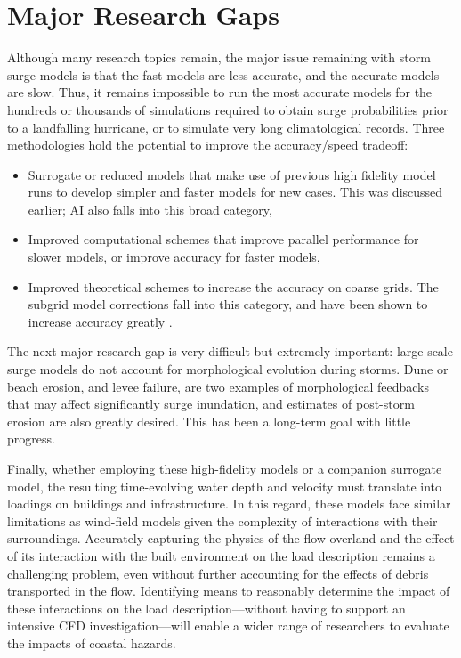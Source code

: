 \section{Major Research Gaps}
\label{sec:storm_surge_gaps}

Although many research topics remain, the major issue remaining with storm surge models is that the fast models are less accurate, and the accurate models are slow. Thus, it remains impossible to run the most accurate models for the hundreds or thousands of simulations required to obtain surge probabilities prior to a landfalling hurricane, or to simulate very long climatological records. Three methodologies hold the potential to improve the accuracy/speed tradeoff:

\begin{itemize}
    \item Surrogate or reduced models that make use of previous high fidelity model runs to develop simpler and faster models for new cases. This was discussed earlier; AI also falls into this broad category,
    \item Improved computational schemes that improve parallel performance for slower models, or improve accuracy for faster models,
    \item Improved theoretical schemes to increase the accuracy on coarse grids. The subgrid model corrections fall into this category, and have been shown to increase accuracy greatly \citep{kennedy2019a}.
\end{itemize}

The next major research gap is very difficult but extremely important: large scale surge models do not account for morphological evolution during storms. Dune or beach erosion, and levee failure, are two examples of morphological feedbacks that may affect significantly surge inundation, and estimates of post-storm erosion are also greatly desired. This has been a long-term goal with little progress.

Finally, whether employing these high-fidelity models or a companion surrogate model, the resulting time-evolving water depth and velocity must translate into loadings on buildings and infrastructure. In this regard, these models face similar limitations as wind-field models given the complexity of interactions with their surroundings. Accurately capturing the physics of the flow overland and the effect of its interaction with the built environment on the load description remains a challenging problem, even without further accounting for the effects of debris transported in the flow. Identifying means to reasonably determine the impact of these interactions on the load description—without having to support an intensive CFD investigation—will enable a wider range of researchers to evaluate the impacts of coastal hazards. 
 
